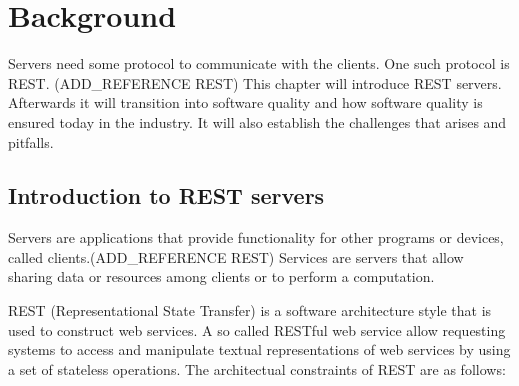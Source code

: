 \chapter{Background}\label{background}

Servers need some protocol to communicate with the clients. One such protocol
is REST. (ADD\_REFERENCE REST) This chapter will introduce REST servers. Afterwards it will
transition into software quality and how software quality is ensured today in
the industry. It will also establish the challenges that arises and pitfalls.

\section{Introduction to REST servers}

Servers are applications that provide functionality for other programs or
devices, called clients.(ADD\_REFERENCE REST) Services are servers that allow sharing data or
resources among clients or to perform a computation.

REST (Representational State Transfer) is a software architecture style that is
used to construct web services. A so called RESTful web service allow requesting
systems to access and manipulate textual representations of web services by
using a set of stateless operations. The architectual constraints of REST are as
follows:

